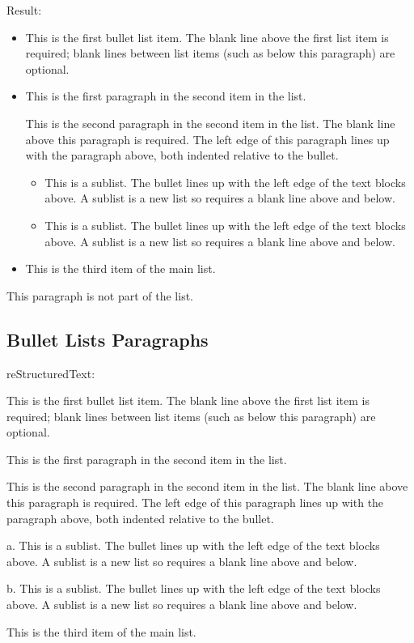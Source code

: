\documentclass[letterpaper,12pt,english]{sphinxmanual}
\begin{document}
Result:
\begin{itemize}
\item {} 
This is the first bullet list item.  The blank line above the
first list item is required; blank lines between list items
(such as below this paragraph) are optional.

\item {} 
This is the first paragraph in the second item in the list.

This is the second paragraph in the second item in the list.
The blank line above this paragraph is required.  The left edge
of this paragraph lines up with the paragraph above, both
indented relative to the bullet.
\begin{itemize}
\item {} 
This is a sublist.  The bullet lines up with the left edge of
the text blocks above.  A sublist is a new list so requires a
blank line above and below.

\item {} 
This is a sublist.  The bullet lines up with the left edge of
the text blocks above.  A sublist is a new list so requires a
blank line above and below.

\end{itemize}

\item {} 
This is the third item of the main list.

\end{itemize}

This paragraph is not part of the list.


\subsection{Bullet Lists Paragraphs}
\label{\detokenize{rtxt:id1}}
reStructuredText:

\begin{sphinxVerbatim}[commandchars=\\\{\}]
 This is the first bullet list item.  The blank line above the
   first list item is required; blank lines between list items
   (such as below this paragraph) are optional.

 This is the first paragraph in the second item in the list.

   This is the second paragraph in the second item in the list.
   The blank line above this paragraph is required.  The left edge
   of this paragraph lines up with the paragraph above, both
   indented relative to the bullet.

   a. This is a sublist.  The bullet lines up with the left edge of
      the text blocks above.  A sublist is a new list so requires a
      blank line above and below.

   b. This is a sublist.  The bullet lines up with the left edge of
      the text blocks above.  A sublist is a new list so requires a
      blank line above and below.


 This is the third item of the main list.
\end{sphinxVerbatim}
\end{document}
